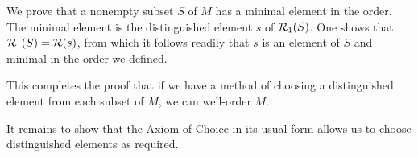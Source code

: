 \documentclass{article}
\begin{document}
We prove that a nonempty subset $S$ of $M$ has a minimal element in the order.  The minimal element is the distinguished element $s$ of ${\cal R}_1(S)$.  One shows
that ${\cal R}_1(S) = {\cal R}(s)$, from which it follows readily that $s$ is an element of $S$ and minimal in the order we defined.

This completes the proof that if we have a method of choosing a distinguished element from each subset of $M$, we can well-order $M$.

It remains to show that the Axiom of Choice in its usual form allows us to choose distinguished elements as required.
\end{document}

